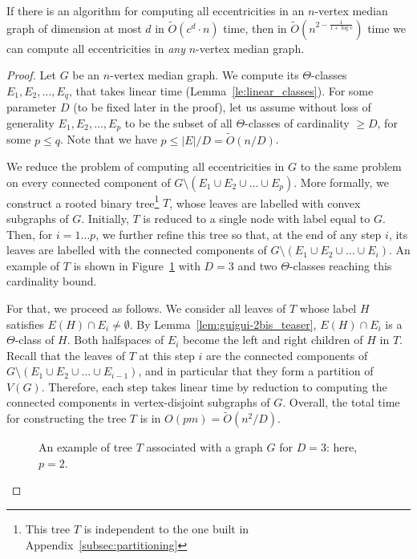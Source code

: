 \documentclass[a4paper,UKenglish,numberwithinsect,cleveref, autoref]{lipics-v2021}
\newcommand{\card}[1]{\left| #1 \right|}
\begin{document}
\begin{lemma}\label{lem:guigui-4}
If there is an algorithm for computing all eccentricities in an $n$-vertex median graph of dimension at most $d$ in $\tilde{O}(c^d \cdot n)$ time, then in $\tilde{O}(n^{2 - \frac 1 {1+\log{c}}})$ time we can compute all eccentricities in {\em any} $n$-vertex median graph.
\end{lemma}
\begin{proof}
Let $G$ be an $n$-vertex median graph.
We compute its $\Theta$-classes $E_1,E_2,\ldots,E_q$, that takes linear time (Lemma~\ref{le:linear_classes}).
For some parameter $D$ (to be fixed later in the proof), let us assume without loss of generality $E_1,E_2,\ldots,E_p$ to be the subset of all $\Theta$-classes of cardinality $\geq D$, for some $p \leq q$. Note that we have $p \leq \card{E}/D = \tilde{O}(n/D)$.

We reduce the problem of computing all eccentricities in $G$ to the same problem on every connected component of $G \setminus (E_1 \cup E_2 \cup \ldots \cup E_p)$. 
More formally, we construct a rooted binary tree\footnote{This tree $T$ is independent to the one built in Appendix~\ref{subsec:partitioning}} $T$, whose leaves are labelled with convex subgraphs of $G$.
Initially, $T$ is reduced to a single node with label equal to $G$.
Then, for $i = 1 \ldots p$, we further refine this tree so that, at the end of any step $i$, its leaves are labelled with the connected components of $G \setminus \left(E_1 \cup E_2 \cup \ldots \cup E_i\right)$. An example of $T$ is shown in Figure~\ref{fig:reduction} with $D=3$ and two $\Theta$-classes reaching this cardinality bound.

For that, we proceed as follows.
We consider all leaves of $T$ whose label $H$ satisfies $E(H) \cap E_i \neq \emptyset$.
By Lemma~\ref{lem:guigui-2bis_teaser}, $E(H) \cap E_i$ is a $\Theta$-class of $H$.
Both halfspaces of $E_i$ become the left and right children of $H$ in $T$. 
Recall that the leaves of $T$ at this step $i$ are the connected components of $G \setminus (E_1 \cup E_2 \cup \ldots \cup E_{i-1})$, and in particular that they form a partition of $V(G)$.
Therefore, each step takes linear time by reduction to computing the connected components in vertex-disjoint subgraphs of $G$.
Overall, the total time for constructing the tree $T$ is in ${O}(pm) = \tilde{O}(n^2/D)$.

\begin{figure}[h]
\centering
\scalebox{0.6}{}
\caption{An example of tree $T$ associated with a graph $G$ for $D=3$: here, $p=2$.}
\label{fig:reduction}
\end{figure}


\end{proof}
\end{document}
